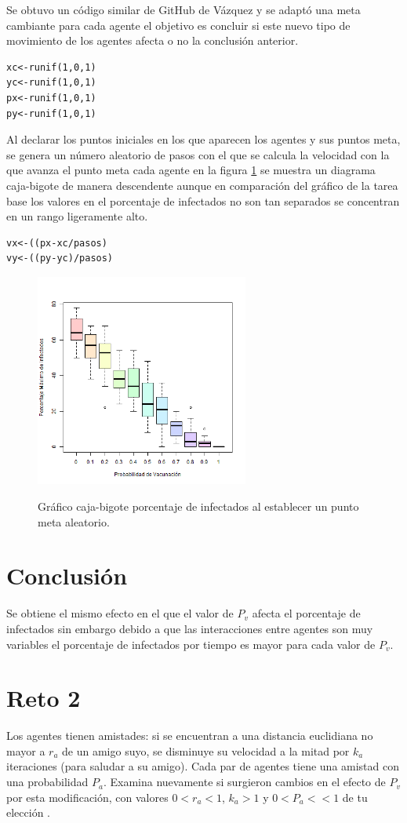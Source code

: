 \documentclass[a4paper]{article}
\begin{document}
\justify Se obtuvo un código similar de GitHub de Vázquez \cite{gitvazquez} y se adaptó una meta cambiante para cada agente el objetivo es concluir si este nuevo tipo de movimiento de los agentes afecta o no la conclusión anterior.
\begin{lstlisting}
xc<-runif(1,0,1)
yc<-runif(1,0,1)
px<-runif(1,0,1)
py<-runif(1,0,1)
\end{lstlisting}
Al declarar los puntos iniciales en los que aparecen los agentes y sus puntos meta, se genera un número aleatorio de pasos con el que se calcula la velocidad con la que avanza el punto meta cada agente en la figura \ref{reto1} se muestra un diagrama caja-bigote de manera descendente aunque en comparación del gráfico de la tarea base los valores en el porcentaje de infectados no son tan separados se concentran en un rango ligeramente alto.
\begin{lstlisting}
vx<-((px-xc/pasos)
vy<-((py-yc)/pasos)
\end{lstlisting}
\begin{figure}[h!]
    \centering

\includegraphics[width=70mm]{reto1 porcentajes.png}
\label{c13}
\caption{Gráfico caja-bigote porcentaje de infectados al establecer un punto meta aleatorio.}
    \label{reto1}
\end{figure}

\section{Conclusión}
 \justify Se obtiene el mismo efecto en el que el valor de $P_v$ afecta el porcentaje de infectados sin embargo debido a que las interacciones entre agentes son muy variables el porcentaje de infectados por tiempo es mayor para cada valor de $P_v$.

\section{Reto 2}
\justify Los agentes tienen amistades: si se encuentran a una distancia euclidiana no mayor a $r_a$ de un amigo suyo, se disminuye su velocidad a la mitad por $k_a$ iteraciones (para saludar a su amigo). Cada par de agentes tiene una amistad con una probabilidad $P_a$. Examina nuevamente si surgieron cambios en el efecto de $P_v$ por esta modificación, con valores $0 < r_a < 1$, $k_a > 1$ y $0 < P_a << 1$ de tu elección \cite{p5}.
\end{document}
